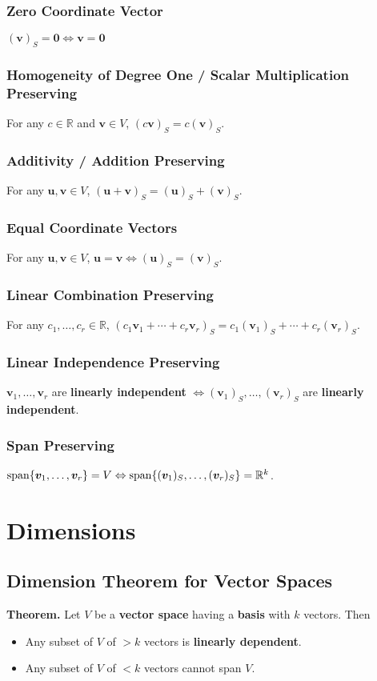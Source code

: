\documentclass[../ma2001_notes.tex]{subfiles}
\begin{document}
\subsubsection{Zero Coordinate Vector}
\((\bm{v})_S=\bm{0}\Leftrightarrow\bm{v}=\bm{0}\)

\subsubsection{Homogeneity of Degree One / Scalar Multiplication Preserving}
For any \(c\in\mathbb{R}\) and \(\bm{v}\in V\), \((c\bm{v})_S=c(\bm{v})_S\).

\subsubsection{Additivity / Addition Preserving}
For any \(\bm{u},\bm{v}\in V\), \((\bm{u}+\bm{v})_S=(\bm{u})_S+(\bm{v})_S\).

\subsubsection{Equal Coordinate Vectors}
For any \(\bm{u},\bm{v}\in V\), \(\bm{u}=\bm{v}\Leftrightarrow(\bm{u})_S=(\bm{v})_S\).

\subsubsection{Linear Combination Preserving}
For any \(c_1,\ldots,c_r\in\mathbb{R}\), \((c_1\bm{v}_1+\cdots+c_r\bm{v}_r)_S=c_1(\bm{v}_1)_S+\cdots+c_r(\bm{v}_r)_S\).

\subsubsection{Linear Independence Preserving}
\(\bm{v}_1,\ldots,\bm{v}_r\) are \textbf{linearly independent} \(\Leftrightarrow(\bm{v}_1)_S,\ldots,(\bm{v}_r)_S\) are \textbf{linearly independent}.

\subsubsection{Span Preserving}
\(\operatorname{span}\{\bm{v}_1,\ldots,\bm{v}_r\}=V\Leftrightarrow\operatorname{span}\{(\bm{v}_1)_S,\ldots,(\bm{v}_r)_S\}=\mathbb{R}^k\).

\section{Dimensions}
\subsection{Dimension Theorem for Vector Spaces}
\textbf{Theorem.} Let \(V\) be a \textbf{vector space} having a \textbf{basis} with \(k\) vectors. Then
\begin{itemize}
	\item Any subset of \(V\) of \(>k\) vectors is \textbf{linearly dependent}.
	\item Any subset of \(V\) of \(<k\) vectors cannot span \(V\).
\end{itemize}
\end{document}
